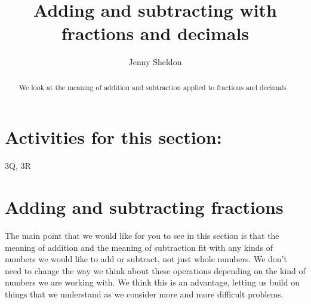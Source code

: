 \documentclass{ximera}
\title{Adding and subtracting with fractions and decimals}
\author{Jenny Sheldon}
\begin{document}
\begin{abstract}
We look at the meaning of addition and subtraction applied to fractions and decimals.
\end{abstract}
\maketitle

\section{Activities for this section:} 3Q, 3R

\section{Adding and subtracting fractions}

The main point that we would like for you to see in this section is that the meaning of addition and the meaning of subtraction fit with any kinds of numbers we would like to add or subtract, not just whole numbers. We don't need to change the way we think about these operations depending on the kind of numbers we are working with. We think this is an advantage, letting us build on things that we understand as we consider more and more difficult problems.
\end{document}
